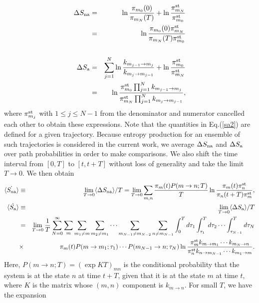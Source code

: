 \documentclass[aps,pre,amsmath,amssymb,floatfix,preprint,nofootinbib]{revtex4}
\begin{document}
\begin{eqnarray}
\Delta S_{\rm na} &=&  \ln \frac{\pi_{m_0}(0)}{\pi_{m_N} (T)} 
+ \ln \frac{\pi^{\rm st}_{m_N}} {\pi^{\rm st}_{m_0}}\nonumber\\
&=&  \ln \frac{\pi_{m_0}(0) \pi^{\rm st}_{m_N}}{\pi_{m_N} (T) \pi^{\rm st}_{m_0}} \nonumber\\
\nonumber\\   
\Delta S_{\rm a} &=& \sum_{j=1}^N \ln  \frac{ k_{m_{j-1} \to m_j}   }{ k_{m_{j} \to m_{j-1}} }+ \ln \frac{\pi^{\rm st}_{m_0}} {\pi^{\rm st}_{m_N}}\nonumber\\  
&=& \ln  \frac{\pi^{\rm st}_{m_0} \prod_{j=1}^N  k_{m_{j-1} \to m_j}   }{\pi^{\rm st}_{m_N} \prod_{j=1}^N k_{m_{j} \to m_{j-1}} }, \label{sa2}
\end{eqnarray}
where $\pi^{\rm st}_{m_j}$ with $1 \leq j \leq N-1$ from the denominator and numerator cancelled each other to obtain these expressions.
Note that the quantities in Eq.(\ref{sa2}) are defined for a given trajectory. Because entropy production for an ensemble of such trajectories is considered in the current work, we average $\Delta S_{\rm na}$ and $\Delta S_{\rm a}$ over path probabilities in order to make comparisons. We also shift the time interval from $[0,T]$ to $[t,t+T]$ without loss of generality and take the limit $T \to 0$. We then obtain 
\begin{eqnarray}
\langle \dot {S_{\rm na}} \rangle &\equiv& \lim_{T \to 0} \langle \Delta S_{\rm na} \rangle/T =  \lim_{T \to 0} \sum_{m,n}  \frac{\pi_m(t) P(m \to n; T)}{T}\ln \frac{\pi_m (t) \pi^{\rm st}_{n}}{\pi_{n} (t+T) \pi^{\rm st}_{m}},\nonumber\\    
\langle \dot {S_{\rm a}} \rangle &\equiv& \lim_{T \to 0} \langle \Delta S_{\rm a} \rangle/T \nonumber\\
&=&   \lim_{T \to 0} \frac{1}{T}  \sum_{N=0}^\infty \sum_{m}  \sum_{m_1 \ne m} \sum_{m_2 \ne m_1} \cdots \sum_{m_{N-1} \ne m_{N-2}} \sum_{n \ne m_{N-1}} \int_0^{T} d\tau_1 \int_{\tau_1}^{T} d\tau_2 \cdots \int_{\tau_{N-1}}^T d\tau_N \nonumber\\
&\times& \pi_m(t) P(m \to m_1; \tau_1) \cdots P(m_{N-1} \to n; \tau_N) \ln  \frac{\pi^{\rm st}_{m} k_{m \to m_1} \cdots k_{m_N \to n}   }{\pi^{\rm st}_{n} k_{n \to m_{N-1}} \cdots k_{m_1 \to m} }. \label{sa3}
\end{eqnarray}
Here, $P(m \to n; T)= (\exp K T)_{m n}$ is the conditional probability that the system is at the state $n$ at time $t+T$, given that it is at the state $m$ at time $t$, where $K$ is the matrix whose $(m,n)$ component is $k_{m \to n}$. For small $T$, we have the expansion
\end{document}
